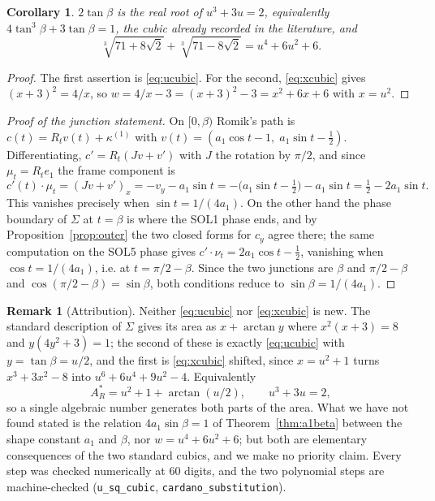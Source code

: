 \documentclass[11pt]{article}
\newtheorem{corollary}[theorem]{Corollary}
\theoremstyle{definition}
\newtheorem{remark}[theorem]{Remark}
\newcommand{\Sig}{\Sigma}
\begin{document}
\begin{corollary}\label{cor:ucubic}
$2\tan\beta$ is the real root of $u^{3}+3u=2$, equivalently
$4\tan^{3}\beta+3\tan\beta=1$, the cubic already recorded in the literature, and
\[
  \sqrt[3]{71+8\sqrt2}+\sqrt[3]{71-8\sqrt2}=u^{4}+6u^{2}+6 .
\]
\end{corollary}

\begin{proof}
The first assertion is \eqref{eq:ucubic}. For the second, \eqref{eq:xcubic} gives
$(x+3)^{2}=4/x$, so $w=4/x-3=(x+3)^{2}-3=x^{2}+6x+6$ with $x=u^{2}$.
\end{proof}

\begin{proof}[Proof of the junction statement]
On $[0,\beta)$ Romik's path is $c(t)=R_tv(t)+\kappa^{(1)}$ with
$v(t)=(a_1\cos t-1,\;a_1\sin t-\tfrac12)$. Differentiating,
$c'=R_t(Jv+v')$ with $J$ the rotation by $\pi/2$, and since $\mu_t=R_te_1$ the
frame component is
\[
  c'(t)\cdot\mu_t=(Jv+v')_x=-v_y-a_1\sin t
   =-\bigl(a_1\sin t-\tfrac12\bigr)-a_1\sin t=\tfrac12-2a_1\sin t .
\]
This vanishes precisely when $\sin t=1/(4a_1)$. On the other hand the phase
boundary of $\Sig$ at $t=\beta$ is where the SOL1 phase ends, and by
Proposition~\ref{prop:outer} the two closed forms for $c_y$ agree there; the same
computation on the SOL5 phase gives $c'\cdot\nu_t=2a_1\cos t-\tfrac12$, vanishing
when $\cos t=1/(4a_1)$, i.e. at $t=\pi/2-\beta$. Since the two junctions are
$\beta$ and $\pi/2-\beta$ and $\cos(\pi/2-\beta)=\sin\beta$, both conditions
reduce to $\sin\beta=1/(4a_1)$.
\end{proof}

\begin{remark}[Attribution]
Neither \eqref{eq:ucubic} nor \eqref{eq:xcubic} is new. The standard description of
$\Sig$ gives its area as $x+\arctan y$ where $x^{2}(x+3)=8$ and $y(4y^{2}+3)=1$;
the second of these is exactly \eqref{eq:ucubic} with $y=\tan\beta=u/2$, and the
first is \eqref{eq:xcubic} shifted, since $x=u^{2}+1$ turns
$x^{3}+3x^{2}-8$ into $u^{6}+6u^{4}+9u^{2}-4$. Equivalently
\[
  A_R^\ast=u^{2}+1+\arctan(u/2),\qquad u^{3}+3u=2,
\]
so a single algebraic number generates both parts of the area. What we have not
found stated is the relation $4a_1\sin\beta=1$ of
Theorem~\ref{thm:a1beta} between the shape constant $a_1$ and $\beta$, nor
$w=u^{4}+6u^{2}+6$; but both are elementary consequences of the two standard
cubics, and we make no priority claim. Every step was checked numerically at $60$
digits, and the two polynomial steps are machine-checked (\verb|u_sq_cubic|,
\verb|cardano_substitution|).
\end{remark}
\end{document}
